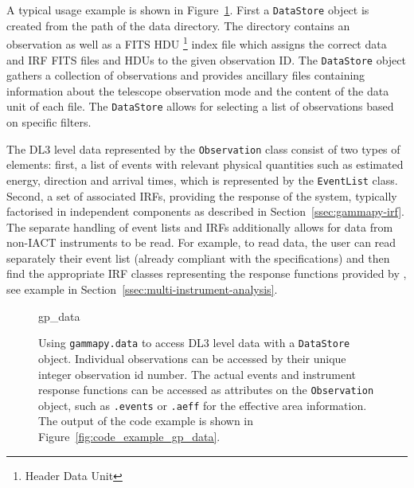 \documentclass[longauth]{aa}
\newcommand{\code}[1]{\texttt{#1}}
\begin{document}
A typical usage example is shown in Figure~\ref{fig*:minted:gp_data}.
First a \code{DataStore} object is created from the path of the data
directory. The directory contains an observation as well as a FITS HDU \footnote{Header Data Unit} 
index file which assigns the correct data and IRF FITS files and HDUs
to the given observation ID. The \code{DataStore}
object gathers a collection of observations and provides ancillary
files containing information about the telescope observation mode and the
content of the data unit of each file. The \code{DataStore} allows for
selecting a list of observations based on specific filters.

The DL3 level data represented by the \code{Observation} class consist
of two types of elements: first, a list of \gammaray events with relevant physical
quantities such as estimated energy, direction and arrival
times, which is represented by the \code{EventList} class. Second, a set of
associated IRFs, providing the response of the system, typically
factorised in independent components as described in
Section~\ref{ssec:gammapy-irf}. The separate handling of event lists and IRFs
additionally allows for data from non-IACT \gammaray instruments to be read. For
example, to read \fermi data, the user can read separately their event list
(already compliant with the \gadf specifications) and then find the appropriate
IRF classes representing the response functions provided by \fermi, see
example in Section~\ref{ssec:multi-instrument-analysis}.

\begin{figure}
	\small
	{gp_data}
	\caption{
        Using \code{gammapy.data} to access DL3 level data with a \code{DataStore} object.
        Individual observations can be accessed by their unique integer observation id number.
        The actual events and instrument response functions can be accessed
        as attributes on the \code{Observation} object, such as \code{.events}
        or \code{.aeff} for the effective area information. The output
		of the code example is shown in Figure~\ref{fig:code_example_gp_data}.
    }
	\label{fig*:minted:gp_data}
\end{figure}
%
\end{document}
